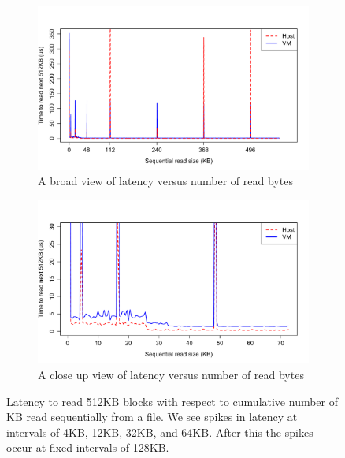 \begin{figure}[ht!]
	\begin{subfigure}[t]{0.5\textwidth}
	\includegraphics[width=\textwidth]{./figures/p2_big.pdf}
	\caption{A broad view of latency versus number of read bytes}
	\label{fig:p2_graph_big}
	\end{subfigure}
	
	\begin{subfigure}[t]{0.5\textwidth}
	\includegraphics[width=\textwidth]{./figures/p2_small.pdf}
	\caption{A close up view of latency versus number of read bytes}
	\label{fig:p2_graph_small}
	\end{subfigure}
	\caption{Latency to read 512KB blocks with respect to cumulative
	number of KB read sequentially from a file. We see spikes in latency
	at intervals of 4KB, 12KB, 32KB, and 64KB. After this the spikes
	occur at fixed intervals of 128KB.}
\end{figure}

